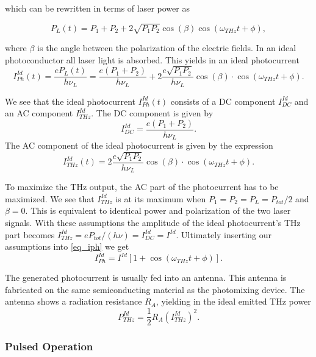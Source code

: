 which can be rewritten in terms of laser power as 

\begin{equation}
	P_L(t) = P_1 + P_2 + 2\sqrt{P_1 P_2}\cos(\beta)\cos(\omega_{THz}t + \phi), 
\end{equation}

where $\beta$ is the angle between the polarization of the electric fields. In an ideal photoconductor all laser light is absorbed. This yields in an ideal photocurrent 
\begin{equation}
	I_{Ph}^{Id}(t) = \frac{eP_L(t)}{h\nu_L} = \frac{e(P_1+P_2)}{h\nu_L} + 2\frac{e\sqrt{P_1P_2}}{h\nu_L}\cos(\beta)\cdot\cos(\omega_{THz}t + \phi).
	\label{eq_iph}
\end{equation}

We see that the ideal photocurrent $I_{Ph}^{Id}(t)$ consists of a DC component $I_{DC}^{Id}$ and an AC component $I_{THz}^{Id}$.
The DC component is given by 
\begin{equation}
	I_{DC}^{Id} = \frac{e(P_1+P_2)}{h\nu_L}.
\end{equation} 
The AC component of the ideal photocurrent is given by the expression
\begin{equation}
	I_{THz}^{Id}(t) = 2\frac{e\sqrt{P_1P_2}}{h\nu_L}\cos(\beta)\cdot\cos(\omega_{THz}t + \phi).
\end{equation}

To maximize the THz output, the AC part of the photocurrent has to be maximized. We see that $I_{THz}^{Id}$ is at its maximum when $P_1 = P_2 = P_L = P_{tot} / 2$ and $\beta = 0$. This is equivalent to identical power and polarization of the two laser signals. With these assumptions the amplitude of the ideal photocurrent's THz part becomes $I_{THz}^{Id} = eP_{tot} / (h\nu) = I_{DC}^{Id} = I^{Id}$. Ultimately inserting our assumptions into \ref{eq_iph} we get 
\begin{equation}
	I_{Ph}^{Id} = I^{Id}[1 + \cos(\omega_{THz}t + \phi)].
	\label{eq8}
\end{equation}

The generated photocurrent is usually fed into an antenna. This antenna is fabricated on the same semiconducting material as the photomixing device. The antenna shows a radiation resistance $R_A$, yielding in the ideal emitted THz power 
\begin{equation}
	P_{THz}^{Id}=\frac{1}{2}R_A (I_{THz}^{Id})^2.
	\label{eq_thz_pow}
\end{equation}

\subsubsection{Pulsed Operation}

